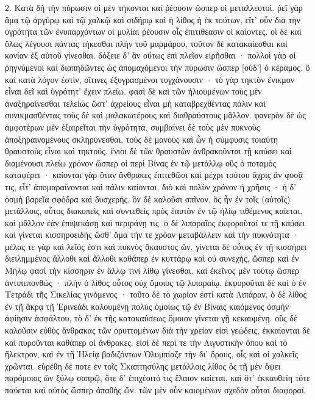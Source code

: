 \documentclass[a4paper, 11pt, oneside, polutonikogreek, german]{article}
\begin{document}
2. Κατὰ δὴ τὴν πύρωσιν οἱ μὲν τήκονται καὶ ῥέουσιν ὥσπερ οἱ μεταλλευτοί. ῥεῖ γὰρ ἅμα τῷ ἀργύρῳ καὶ τῷ χαλκῷ καὶ σιδήρῳ καὶ ἡ λίθος ἡ ἐκ τούτων, εἴτ' οὖν διὰ τὴν ὑγρότητα τῶν ἐνυπαρχόντων οἱ μυλίαι ῥέουσιν οἷς ἐπιτιθέασιν οἱ καίοντες. οἱ δὲ καὶ ὅλως λέγουσι πάντας τήκεσθαι πλὴν τοῦ μαρμάρου, τοῦτον δὲ κατακαίεσθαι καὶ κονίαν ἐξ αὐτοῦ γίνεσθαι. δόξειε δ' ἂν οὕτως ἐπὶ πλεῖον εἰρῆσθαι · πολλοὶ γὰρ οἱ ῥηγνύμενοι καὶ διαπηδῶντες ὡς ἀπομαχόμενοι τὴν πύρωσιν ὥσπερ [οὐδ'] ὁ κέραμος. ὃ καὶ κατὰ λόγον ἐστὶν, οἵτινες ἐξυγρασμένοι τυγχάνουσιν · τὸ γὰρ τηκτὸν ἔνικμον εἶναι δεῖ καὶ ὑγρότητ' ἔχειν πλείω. φασὶ δὲ καὶ τῶν ἡλιουμένων τοὺς μὲν ἀναξηραίνεσθαι τελείως ὥστ' ἀχρείους εἶναι μὴ καταβρεχθέντας πάλιν καὶ συνικμασθέντας τοὺς δὲ καὶ μαλακωτέρους καὶ διαθραύστους μᾶλλον. φανερὸν δὲ ὡς ἀμφοτέρων μὲν ἐξαιρεῖται τὴν ὑγρότητα, συμβαίνει δὲ τοὺς μὲν πυκνοὺς ἀποξηραινομένους σκληρύνεσθαι, τοὺς δὲ μανοὺς καὶ ὧν ἡ σύμφυσις τοιαύτη θραυστοὺς εἶναι καὶ τηκτούς. ἔνιοι δὲ τῶν θραυστῶν ἀνθρακοῦνται τῇ καύσει καὶ διαμένουσι πλείω χρόνον ὥσπερ οἱ περὶ Βίνας ἐν τῷ μετάλλῳ οὓς ὁ ποταμὸς καταφέρει · καίονται γὰρ ὅταν ἄνθρακες ἐπιτεθῶσι καὶ μέχρι τούτου ἄχρις ἂν φυσᾷ τις, εἶτ' ἀπομαραίνονται καὶ πάλιν καίονται, διὸ καὶ πολὺν χρόνον ἡ χρῆσις · ἡ δ' ὀσμὴ βαρεῖα σφόδρα καὶ δυσχερής. ὃν δὲ καλοῦσι σπῖνον, ὃς ἦν ἐν τοῖς (αὐτοῖς) μετάλλοις, οὗτος διακοπεὶς καὶ συντεθεὶς πρὸς ἑαυτὸν ἐν τῷ ἡλίῳ τιθέμενος καίεται, καὶ μᾶλλον ἐὰν ἐπιψεκάσῃ καὶ περιράνῃ τις. ὁ δὲ λιπαραῖος ἐκφοροῦταί τε τῇ καύσει καὶ γίνεται κισσηροειδὴς ὥσθ' ἅμα τήν τε χρόαν μεταβάλλειν καὶ τὴν πυκνότητα · μέλας τε γὰρ καὶ λεῖός ἐστι καὶ πυκνὸς ἄκαυστος ὤν. γίνεται δὲ οὗτος ἐν τῇ κισσήρει διειλημμένος ἄλλοθι καὶ ἄλλοθι καθάπερ ἐν κυττάρῳ καὶ οὐ συνεχὴς, ὥσπερ καὶ ἐν Μήλῳ φασὶ τὴν κίσσηριν ἐν ἄλλῳ τινὶ λίθῳ γίνεσθαι. καὶ ἐκεῖνος μὲν τούτῳ ὥσπερ ἀντιπεπονθώς · πλὴν ὁ λίθος οὗτος οὐχ ὅμοιος τῷ λιπαραίῳ. ἐκφοροῦται δὲ καὶ ὁ ἐν Τετράδι τῆς Σικελίας γινόμενος · τοῦτο δὲ τὸ χωρίον ἐστὶ κατὰ Λιπάραν, ὁ δὲ λίθος ἐν τῇ ἄκρᾳ τῇ Ἐρινεάδι καλουμένῃ πολὺς ὁμοίως τῷ ἐν Βίναις καιόμενος ὀσμὴν ἀφίησιν ἀσφάλτου, τὸ δ' ἐκ τῆς κατακαύσεως ὅμοιον γίνεται γῇ κεκαυμένῃ. οὓς δὲ καλοῦσιν εὐθὺς ἄνθρακας τῶν ὀρυττομένων διὰ τὴν χρείαν εἰσὶ γεώδεις, ἐκκαίονται δὲ καὶ πυροῦνται καθάπερ οἱ ἄνθρακες. εἰσὶ δὲ περί τε τὴν Λιγυστικὴν ὅπου καὶ τὸ ἤλεκτρον, καὶ ἐν τῇ Ἠλείᾳ βαδιζόντων Ὀλυμπίαζε τὴν δι' ὄρους, οἷς καὶ οἱ χαλκεῖς χρῶνται. εὑρέθη δέ ποτε ἐν τοῖς Σκαπτησύλης μετάλλοις λίθος ὃς τῇ μὲν ὄψει παρόμοιος ὢν ξύλῳ σαπρῷ, ὅτε δ' ἐπιχέοιτό τις ἔλαιον καίεται, καὶ ὅτ' ἐκκαυθείη τότε παύεται καὶ αὐτὸς ὥσπερ ἀπαθὴς ὤν. τῶν μὲν οὖν καιομένων σχεδὸν αὗται διαφοραί.
\end{document}
